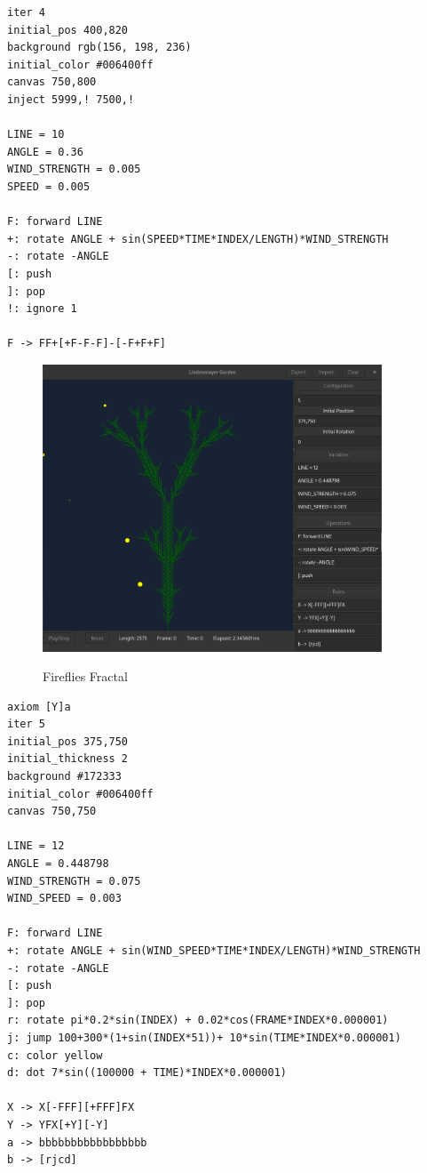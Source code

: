 \documentclass[a4paper]{article}
\begin{document}
\begin{lstlisting}[style=boxed]
iter 4
initial_pos 400,820
background rgb(156, 198, 236)
initial_color #006400ff
canvas 750,800
inject 5999,! 7500,!

LINE = 10
ANGLE = 0.36
WIND_STRENGTH = 0.005
SPEED = 0.005

F: forward LINE
+: rotate ANGLE + sin(SPEED*TIME*INDEX/LENGTH)*WIND_STRENGTH
-: rotate -ANGLE
[: push
]: pop
!: ignore 1

F -> FF+[+F-F-F]-[-F+F+F]
\end{lstlisting}

\pagebreak

\begin{figure}[h]
    \centering
    \includegraphics[width=0.9\textwidth]{media/gui/gui-fireflies.png}
    \label{fig:fireflies}
    \caption{Fireflies Fractal}
\end{figure}

\begin{lstlisting}[style=boxed]
axiom [Y]a
iter 5
initial_pos 375,750
initial_thickness 2
background #172333
initial_color #006400ff
canvas 750,750

LINE = 12
ANGLE = 0.448798
WIND_STRENGTH = 0.075
WIND_SPEED = 0.003

F: forward LINE 
+: rotate ANGLE + sin(WIND_SPEED*TIME*INDEX/LENGTH)*WIND_STRENGTH
-: rotate -ANGLE
[: push
]: pop
r: rotate pi*0.2*sin(INDEX) + 0.02*cos(FRAME*INDEX*0.000001)
j: jump 100+300*(1+sin(INDEX*51))+ 10*sin(TIME*INDEX*0.000001)
c: color yellow
d: dot 7*sin((100000 + TIME)*INDEX*0.000001)

X -> X[-FFF][+FFF]FX
Y -> YFX[+Y][-Y]
a -> bbbbbbbbbbbbbbbbb
b -> [rjcd]
\end{lstlisting}
\end{document}
